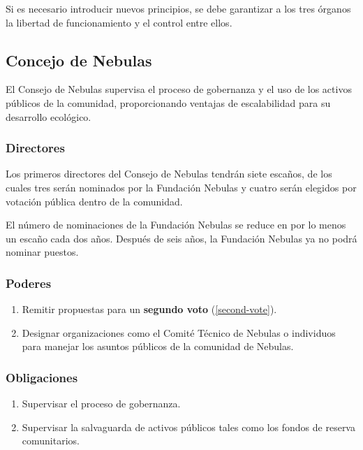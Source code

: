 Si es necesario introducir nuevos principios, se debe garantizar a los tres órganos la libertad de funcionamiento y el control entre ellos.

\subsection{Concejo de Nebulas}

El Consejo de Nebulas supervisa el proceso de gobernanza y el uso de los activos públicos de la comunidad, proporcionando ventajas de escalabilidad para su desarrollo ecológico.

\subsubsection{Directores}

Los primeros directores del Consejo de Nebulas tendrán siete escaños, de los cuales tres serán nominados por la Fundación Nebulas y cuatro serán elegidos por votación pública dentro de la comunidad.

El número de nominaciones de la Fundación Nebulas se reduce en por lo menos un escaño cada dos años. Después de seis años, la Fundación Nebulas ya no podrá nominar puestos.

\subsubsection{Poderes}

\begin{enumerate}
	\item Remitir propuestas para un \textbf{segundo voto} (\ref{second-vote}).
	\item Designar organizaciones como el Comité Técnico de Nebulas o individuos para manejar los asuntos públicos de la comunidad de Nebulas.
\end{enumerate}

\subsubsection{Obligaciones}

\begin{enumerate}
	\item Supervisar el proceso de gobernanza.
	\item Supervisar la salvaguarda de activos públicos tales como los fondos de reserva comunitarios.
\end{enumerate}

